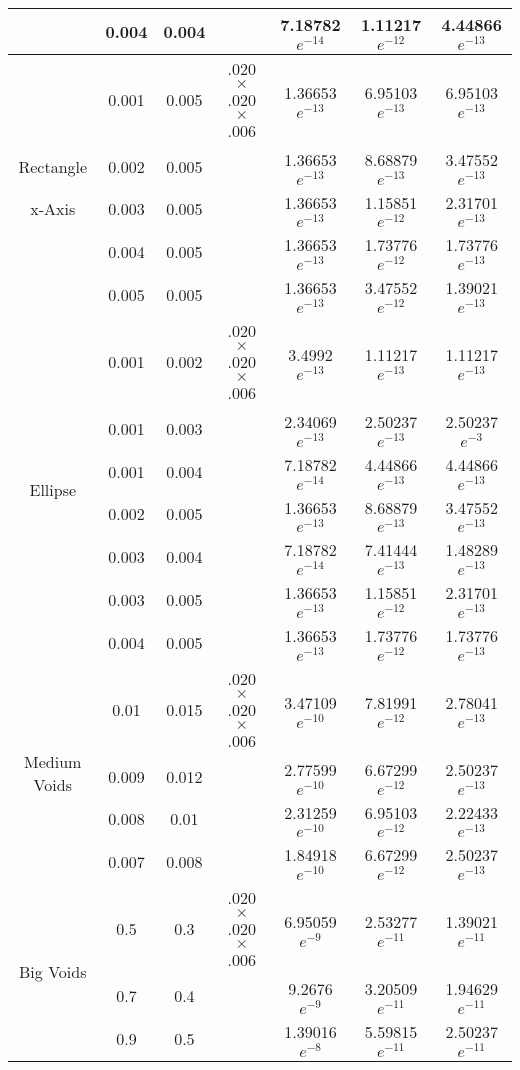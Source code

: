 \begin{table}[h!]
\begin{tabular}{|c|c|c|c|c|c|c|}
 			&0.004&0.004	& 								& 7.18782$e^{-14}$ & 1.11217$e^{-12}$ &4.44866$e^{-13}$ \\ \hline \hline
			&0.001&0.005	&.020$\times$.020$\times$.006	& 1.36653$e^{-13}$ & 6.95103$e^{-13}$ &6.95103$e^{-13}$ \\ \cline{2-7}
Rectangle	&0.002&0.005	& 								& 1.36653$e^{-13}$ & 8.68879$e^{-13}$ &3.47552$e^{-13}$ \\ \cline{2-7}
x-Axis		&0.003&0.005	& 								&1.36653$e^{-13}$  &1.15851$e^{-12}$  &2.31701$e^{-13}$ \\ \cline{2-7}
 			&0.004&0.005	& 								&1.36653$e^{-13}$  &1.73776$e^{-12}$  &1.73776$e^{-13}$ \\ \cline{2-7}
 			&0.005&0.005	& 								&1.36653$e^{-13}$  &3.47552$e^{-12}$  &1.39021$e^{-13}$ \\ \hline \hline
\multirow{7}{*}{Ellipse}&0.001&0.002&.020$\times$.020$\times$.006&3.4992$e^{-13}$   &1.11217$e^{-13}$  &1.11217$e^{-13}$ \\ \cline{2-7}
 			&0.001&0.003	& 								&2.34069$e^{-13}$  &2.50237$e^{-13}$  &2.50237$e^{-3}$ \\ \cline{2-7}
 			&0.001&0.004	& 								&7.18782$e^{-14}$  &4.44866$e^{-13}$  &4.44866$e^{-13}$ \\ \cline{2-7}
			&0.002&0.005&									&1.36653$e^{-13}$&8.68879$e^{-13}$&3.47552$e^{-13}$ \\ \cline{2-7}
 			 &0.003&0.004	& 									&7.18782$e^{-14}$&7.41444$e^{-13}$&1.48289$e^{-13}$ \\ \cline{2-7}
 			 &0.003&0.005	& 									&1.36653$e^{-13}$&1.15851$e^{-12}$&2.31701$e^{-13}$ \\ \cline{2-7}
 			&0.004&0.005	& 									&1.36653$e^{-13}$&1.73776$e^{-12}$&1.73776$e^{-13}$ \\ \hline \hline
\multirow{4}{*}{Medium Voids}&0.01&0.015		&.020$\times$.020$\times$.006		&3.47109$e^{-10}$&7.81991$e^{-12}$&2.78041$e^{-13}$\\ \cline{2-7}
 			&0.009&0.012	& 									&2.77599$e^{-10}$&6.67299$e^{-12}$&2.50237$e^{-13}$ \\ \cline{2-7}
 			&0.008&0.01		& 									&2.31259$e^{-10}$&6.95103$e^{-12}$&2.22433$e^{-13}$ \\ \cline{2-7}
 			&0.007&0.008	& 									&1.84918$e^{-10}$&6.67299$e^{-12}$&2.50237$e^{-13}$ \\ \hline \hline
\multirow{3}{*}{Big Voids}&0.5&0.3	&.020$\times$.020$\times$.006&6.95059$e^{-9}$&2.53277$e^{-11}$&1.39021$e^{-11}$ \\ \cline{2-7}
 			&0.7&0.4		& 									&9.2676$e^{-9}$&3.20509$e^{-11}$&1.94629$e^{-11}$ \\ \cline{2-7}
 			&0.9&0.5		& 									&1.39016$e^{-8}$&5.59815$e^{-11}$&2.50237$e^{-11}$ \\ \hline
\end{tabular} 
\end{table}
\clearpage

